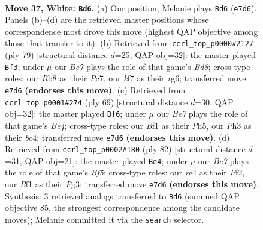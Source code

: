 \documentclass[11pt]{article}
\begin{document}
\clearpage

\begin{figure}[p]\centering
\begin{subfigure}{0.46\textwidth}\centering
\resizebox{\linewidth}{!}{%
\newchessgame
\chessboard[
  setfen={1R6/4Bk2/8/4p3/4r2p/5p1P/b4P2/5BK1 w - - 2 37},
  showmover=false,
  pgfstyle=straightmove, color=movearrow, markmove={e7-d6}
]}
\caption{}
\end{subfigure}\hfill
\begin{subfigure}{0.46\textwidth}\centering
\resizebox{\linewidth}{!}{%
\newchessgame
\chessboard[
  setfen={8/1kp3B1/3b2R1/1p5p/7P/2P3P1/8/3bK3 b - - 5 40},
  showmover=false,
  pgfstyle=straightmove, color=movearrow, markmove={d1-f3}
]}
\caption{}
\end{subfigure}
\\[4pt]
\begin{subfigure}{0.46\textwidth}\centering
\resizebox{\linewidth}{!}{%
\newchessgame
\chessboard[
  setfen={8/8/8/2p1b1kp/2B1K3/1PP5/3r2P1/2R5 b - - 1 35},
  showmover=false,
  pgfstyle=straightmove, color=movearrow, markmove={e5-f6}
]}
\caption{}
\end{subfigure}\hfill
\begin{subfigure}{0.46\textwidth}\centering
\resizebox{\linewidth}{!}{%
\newchessgame
\chessboard[
  setfen={5b2/8/3r1k2/R4Bpp/8/5KPP/5P2/8 w - - 0 42},
  showmover=false,
  pgfstyle=straightmove, color=movearrow, markmove={f5-e4}
]}
\caption{}
\end{subfigure}
\caption{\textbf{Move 37, White: \texttt{Bd6}.} (a) Our position; Melanie plays \texttt{Bd6} (\texttt{e7d6}). Panels (b)--(d) are the retrieved master positions whose correspondence most drove this move (highest QAP objective among those that transfer to it). (b) Retrieved from \texttt{ccrl\_top\_p0000\#2127} (ply 79) [structural distance $d$=25, QAP obj=32]: the master played \texttt{Bf3}; under $\mu$ our \emph{Be7} plays the role of that game's \emph{Bd8}; cross-type roles: our \emph{R}b8 as their \emph{P}c7, our \emph{k}f7 as their \emph{r}g6; transferred move \texttt{e7d6} \textbf{(endorses this move)}. (c) Retrieved from \texttt{ccrl\_top\_p0001\#274} (ply 69) [structural distance $d$=30, QAP obj=32]: the master played \texttt{Bf6}; under $\mu$ our \emph{Be7} plays the role of that game's \emph{Be4}; cross-type roles: our \emph{B}f1 as their \emph{P}h5, our \emph{P}h3 as their \emph{b}c4; transferred move \texttt{e7d6} \textbf{(endorses this move)}. (d) Retrieved from \texttt{ccrl\_top\_p0002\#180} (ply 82) [structural distance $d$=31, QAP obj=21]: the master played \texttt{Be4}; under $\mu$ our \emph{Be7} plays the role of that game's \emph{Bf5}; cross-type roles: our \emph{r}e4 as their \emph{P}f2, our \emph{B}f1 as their \emph{P}g3; transferred move \texttt{e7d6} \textbf{(endorses this move)}. Synthesis: 3 retrieved analogs transferred to \texttt{Bd6} (summed QAP objective 85, the strongest correspondence among the candidate moves); Melanie committed it via the \texttt{search} selector.}
\label{fig:thought-m72}
\end{figure}
\end{document}
